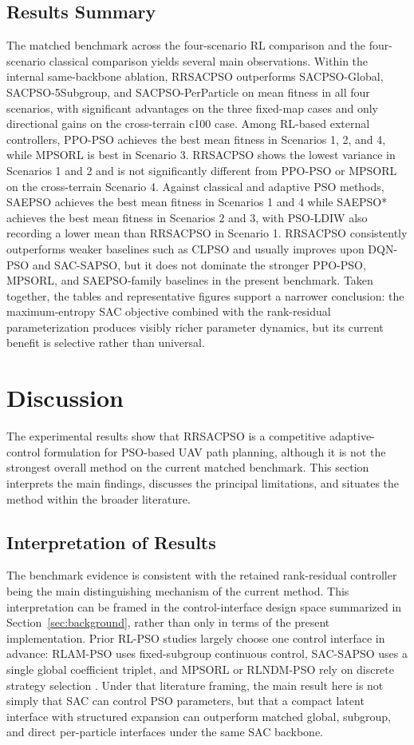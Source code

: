 \documentclass[final,5p,times]{elsarticle}
\begin{document}
\subsection{Results Summary}
The matched benchmark across the four-scenario RL comparison and the four-scenario classical comparison yields several main observations.
Within the internal same-backbone ablation, RRSACPSO outperforms SACPSO-Global, SACPSO-5Subgroup, and SACPSO-PerParticle on mean fitness in all four scenarios, with significant advantages on the three fixed-map cases and only directional gains on the cross-terrain c100 case.
Among RL-based external controllers, PPO-PSO achieves the best mean fitness in Scenarios 1, 2, and 4, while MPSORL is best in Scenario 3.
RRSACPSO shows the lowest variance in Scenarios 1 and 2 and is not significantly different from PPO-PSO or MPSORL on the cross-terrain Scenario 4.
Against classical and adaptive PSO methods, SAEPSO achieves the best mean fitness in Scenarios 1 and 4 while SAEPSO* achieves the best mean fitness in Scenarios 2 and 3, with PSO-LDIW also recording a lower mean than RRSACPSO in Scenario 1.
RRSACPSO consistently outperforms weaker baselines such as CLPSO and usually improves upon DQN-PSO and SAC-SAPSO, but it does not dominate the stronger PPO-PSO, MPSORL, and SAEPSO-family baselines in the present benchmark.
Taken together, the tables and representative figures support a narrower conclusion: the maximum-entropy SAC objective combined with the rank-residual parameterization produces visibly richer parameter dynamics, but its current benefit is selective rather than universal.

\section{Discussion}
\label{sec:discussion}
The experimental results show that RRSACPSO is a competitive adaptive-control formulation for PSO-based UAV path planning, although it is not the strongest overall method on the current matched benchmark.
This section interprets the main findings, discusses the principal limitations, and situates the method within the broader literature.
\subsection{Interpretation of Results}
The benchmark evidence is consistent with the retained rank-residual controller being the main distinguishing mechanism of the current method.
This interpretation can be framed in the control-interface design space summarized in Section~\ref{sec:background}, rather than only in terms of the present implementation.
Prior RL-PSO studies largely choose one control interface in advance: RLAM-PSO uses fixed-subgroup continuous control, SAC-SAPSO uses a single global coefficient triplet, and MPSORL or RLNDM-PSO rely on discrete strategy selection \cite{Yin2023RLAMPSO, vonEschwege2024Soft, Meng2023Multistrategy, Li2023Reinforcement}.
Under that literature framing, the main result here is not simply that SAC can control PSO parameters, but that a compact latent interface with structured expansion can outperform matched global, subgroup, and direct per-particle interfaces under the same SAC backbone.
\end{document}
